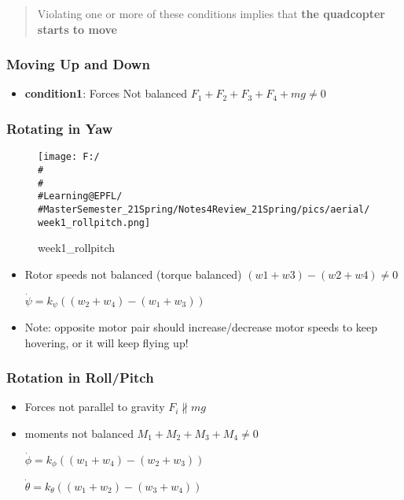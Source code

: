 \documentclass[]{article}
\begin{document}
\begin{quote}
Violating one or more of these conditions implies that \textbf{the
quadcopter starts to move}
\end{quote}

\subsubsection{Moving Up and Down}\label{header-n269}

\begin{itemize}
\item
  \textbf{condition1}: Forces Not balanced
  \(F_1+ F_2+ F_3+ F_4+ mg \neq 0\)
\end{itemize}

\subsubsection{Rotating in Yaw}\label{header-n273}

\begin{figure}
\centering
\texttt{[image: F:/\\\#\\\#\\\#Learning@EPFL/\\\#MasterSemester\_21Spring/Notes4Review\_21Spring/pics/aerial/week1\_rollpitch.png]}
\caption{week1\_rollpitch}
\end{figure}

\begin{itemize}
\item
  Rotor speeds not balanced (torque balanced) \((w1+w3)-(w2+w4) \neq 0\)

  \(\dot{\psi}=k_{\psi}\left(\left({w}_{2}+{w}_{4}\right)-\left({w}_{1}+{w}_{3}\right)\right)\)
\item
  Note: opposite motor pair should increase/decrease motor speeds to
  keep hovering, or it will keep flying up!
\end{itemize}

\subsubsection{Rotation in Roll/Pitch}\label{header-n281}

\begin{itemize}
\item
  Forces not parallel to gravity \(F_i \nparallel mg \)
\item
  moments not balanced \(M_1+M_2+M_3+M_4 \neq 0\)

  \(\dot{\phi}=k_{\phi}\left(\left(w_{1}+w_{4}\right)-\left(w_{2}+w_{3}\right)\right)\)

  \(\dot{\theta}=k_{\theta}\left(\left(w_{1}+w_{2}\right)-\left(w_{3}+w_{4}\right)\right)\)
\end{itemize}
\end{document}
